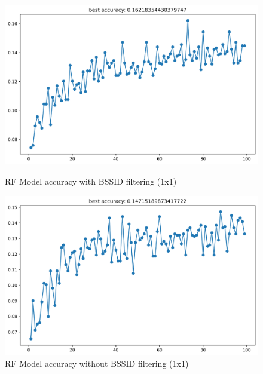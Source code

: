 \documentclass[runningheads]{llncs}
\begin{document}
\begin{figure}[hbt!]
	\centering
	\begin{minipage}{0.45\textwidth}
		\centering
		\includegraphics[width=\linewidth]{image5.png}
		\caption{RF Model accuracy with BSSID filtering (1x1)}
		\label{fig:rf_acc_filter}
	\end{minipage}
	\hfill
	\begin{minipage}{0.45\textwidth}
		\centering
		\includegraphics[width=\linewidth]{image6.png}
		\caption{RF Model accuracy without BSSID filtering (1x1)}
		\label{fig:rf_acc_nofilter}
	\end{minipage}
	
	\vspace{0.5cm} %
	

\end{figure}
\end{document}
